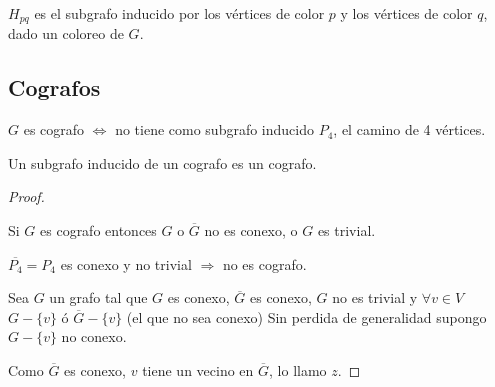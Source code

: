 \begin{nota}
    $H_{pq}$ es el subgrafo inducido por los vértices de color $p$ y los vértices de color $q$, dado un coloreo de $G$.
\end{nota}

\subsection{Cografos}

\begin{prop}
    $G$ es cografo $\Longleftrightarrow$ no tiene como subgrafo inducido $P_4$, el camino de 4 vértices.
\end{prop}

\begin{obs}
    Un subgrafo inducido de un cografo es un cografo.
\end{obs}

\begin{proof}
    ~

    Si $G$ es cografo entonces $G$ o $\overline{G}$ no es conexo, o $G$ es trivial.

    $\overline{P_4} = P_4$ es conexo y no trivial $\Longrightarrow$ no es cografo.

    Sea $G$ un grafo tal que $G$ es conexo, $\overline{G}$ es conexo, $G$ no es trivial y $\forall v \in V$ $G - \{v\}$ ó $\overline{G} - \{v\}$ (el que no sea conexo) Sin perdida de generalidad supongo $G - \{v\}$ no conexo. 

    Como $\overline{G}$ es conexo, $v$ tiene un vecino en $\overline{G}$, lo llamo $z$.
\end{proof}
